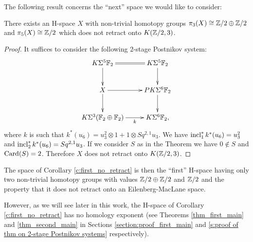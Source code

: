 The following result concerns the ``next'' space we would like to consider:

\begin{cor}\label{c:first_no_retract}
There exists an H-space $X$ with non-trivial homotopy groups $\pi_3(X)\cong\mathbb{Z}/2\oplus\mathbb{Z}/2$ and $\pi_{5}(X)\cong\mathbb{Z}/2$ which does not retract onto $K(\mathbb{Z}/2,3)$.
\end{cor}

\begin{proof}
It suffices to consider the following $2$-stage Postnikov system:
$$\xymatrix{
K\Sigma^{5}\F_2\ar[d]\ar@{=}[r] &K\Sigma^{5}\F_2\ar[d]\\
X\ar[r]\ar[d] &PK\Sigma^{6} \F_2\ar[d]\\
K\Sigma^3(\F_2\oplus\F_2)\ar[r]_-k &K\Sigma^{6} \F_2,
}$$ where $k$ is such that $k^*(u_{6})=u_3^2\otimes1+1\otimes Sq^{2,1}u_3$. We have $\operatorname{incl}_1^*k^*(u_{6})=u_3^2$ and $\operatorname{incl}_2^*k^*(u_{6})=Sq^{2,1}u_3$. If we consider $S$ as in the Theorem we have $0\not\in S$ and $\operatorname{Card}(S)=2$. Therefore $X$ does not retract onto $K(\mathbb{Z}/2,3)$.
\end{proof}

The space of Corollary \ref{c:first_no_retract} is then the ``first'' H-space having only two non-trivial homotopy groups with values $\mathbb{Z}/2\oplus\mathbb{Z}/2$ and $\mathbb{Z}/2$ and the property that it does not retract onto an Eilenberg-MacLane space.

However, as we will see later in this work, the H-space of Corollary \ref{c:first_no_retract} has no homology exponent (see Theorems \ref{thm_first_main} and \ref{thm_second_main} in Sections \ref{section:proof_first_main} and \ref{s:proof of thm on 2-stage Postnikov systems} respectively).

\endinput
